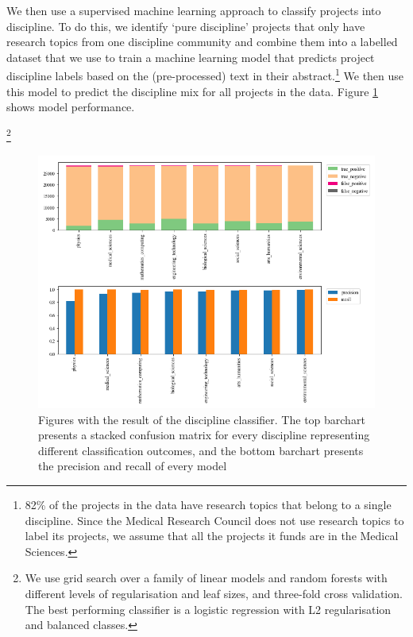 \documentclass[11pt]{article}
\begin{document}
We then use a supervised machine learning approach to classify projects into discipline. To do this, we identify `pure discipline’ projects that only have research topics from one discipline community and combine them into a labelled dataset that we use to train a machine learning model that predicts project discipline labels based on the (pre-processed) text in their abstract.\footnote{82\% of the projects in the data have research topics that belong to a single discipline. Since the Medical Research Council does not use research topics to label its projects, we assume that all the projects it funds are in the Medical Sciences.} We then use this model to predict the discipline mix for all projects in the data. Figure \ref{fig:discipline_classifier} shows model performance.

\footnote{We use grid search over a family of linear models and random forests with different levels of regularisation and leaf sizes, and three-fold cross validation. The best performing classifier is a logistic regression with L2 regularisation and balanced classes.} 

\begin{figure}[!ht]
    \centering
    \includegraphics[width=\textwidth]{figures/fig_3_model_validation.png}
    \caption{Figures with the result of the discipline classifier. The top barchart presents a stacked confusion matrix for every discipline representing different classification outcomes, and the bottom barchart presents the precision and recall of every model}
    \label{fig:discipline_classifier}
\end{figure}
\end{document}
